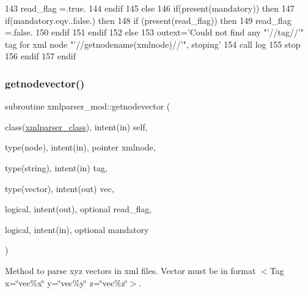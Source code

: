 \begin{DoxyCode}
143             read\_flag =.true.
144 \textcolor{keywordflow}{        endif}
145     \textcolor{keywordflow}{else}
146         \textcolor{keywordflow}{if}(\textcolor{keyword}{present}(mandatory)) \textcolor{keywordflow}{then}
147             \textcolor{keywordflow}{if}(mandatory.eqv..false.) \textcolor{keywordflow}{then}
148                 \textcolor{keywordflow}{if} (\textcolor{keyword}{present}(read\_flag)) \textcolor{keywordflow}{then}
149                     read\_flag =.false.
150 \textcolor{keywordflow}{                endif}
151 \textcolor{keywordflow}{            endif}
152         \textcolor{keywordflow}{else}
153             outext=\textcolor{stringliteral}{'Could not find any "'}//tag//\textcolor{stringliteral}{'" tag for xml node "'}//getnodename(xmlnode)//\textcolor{stringliteral}{'", stoping'}
154             \textcolor{keyword}{call }log%
155             stop
156 \textcolor{keywordflow}{        endif}
157 \textcolor{keywordflow}{    endif}
\end{DoxyCode}
\mbox{\label{namespacexmlparser__mod_a0c2ac0513cee4e660e07cb083a790a53}} 
\subsubsection{\texorpdfstring{getnodevector()}{getnodevector()}}
{\footnotesize\ttfamily subroutine xmlparser\+\_\+mod\+::getnodevector (\begin{DoxyParamCaption}\item[{class(\mbox{\hyperlink{structxmlparser__mod_1_1xmlparser__class}{xmlparser\+\_\+class}}), intent(in)}]{self,  }\item[{type(node), intent(in), pointer}]{xmlnode,  }\item[{type(string), intent(in)}]{tag,  }\item[{type(vector), intent(out)}]{vec,  }\item[{logical, intent(out), optional}]{read\+\_\+flag,  }\item[{logical, intent(in), optional}]{mandatory }\end{DoxyParamCaption})\hspace{0.3cm}{\ttfamily [private]}}



Method to parse xyz vectors in xml files. Vector must be in format \textquotesingle{}$<$\+Tag x=\char`\"{}vec\%x\char`\"{} y=\char`\"{}vec\%y\char`\"{} z=\char`\"{}vec\%z\char`\"{}$>$\textquotesingle{}. 

